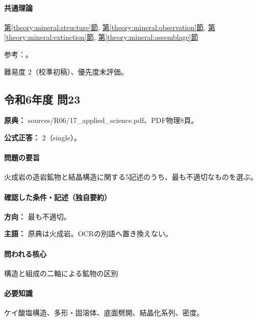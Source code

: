 \paragraph{共通理論} \hyperref[theory:mineral:structure]{第\ref*{theory:mineral:structure}節}, \hyperref[theory:mineral:observation]{第\ref*{theory:mineral:observation}節}, \hyperref[theory:mineral:extinction]{第\ref*{theory:mineral:extinction}節}, \hyperref[theory:mineral:assemblage]{第\ref*{theory:mineral:assemblage}節}

\par 参考：\cite{hom_biotite,hom_augite,nelson_inosilicates,usgs_igneous_components}。

\par 難易度 2（校準初稿）、優先度未評価。

\subsection{令和6年度 問23}
\label{q:r06-reg-applied-23}

\noindent\textbf{原典：} sources/R06/17\_applied\_science.pdf、PDF物理8頁。

\textbf{公式正答：} 2（single）。

\paragraph{問題の要旨} 火成岩の造岩鉱物と結晶構造に関する5記述のうち、最も不適切なものを選ぶ。

\paragraph{確認した条件・記述（独自要約）}\mbox{}\par

\noindent\textbf{方向：} 最も不適切。\par

\noindent\textbf{主語：} 原典は火成岩。OCRの別語へ置き換えない。\par

\paragraph{問われる核心} 構造と組成の二軸による鉱物の区別

\paragraph{必要知識} ケイ酸塩構造、多形・固溶体、底面劈開、結晶化系列、密度。

